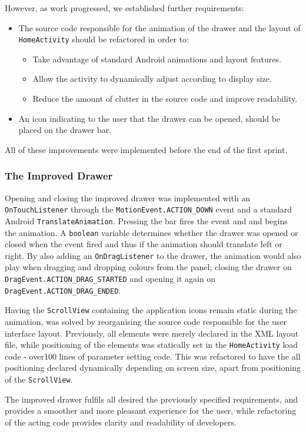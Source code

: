However, as work progressed, we established further requirements:

\begin{itemize}
\item The source code responsible for the animation of the drawer and the layout of \lstinline{HomeActivity} should be refactored in order to:
\begin{itemize}
\item Take advantage of standard Android animations and layout features.
\item Allow the activity to dynamically adjust according to display size.
\item Reduce the amount of clutter in the source code and improve readability.
\end{itemize}
\item An icon indicating to the user that the drawer can be opened, should be placed on the drawer bar.
\end{itemize}

All of these improvements were implemented before the end of the first sprint. 

\subsubsection{The Improved Drawer}

Opening and closing the improved drawer was implemented with an \lstinline{OnTouchListener} through the \lstinline{MotionEvent.ACTION_DOWN} event and a standard Android \lstinline{TranslateAnimation}.
Pressing the bar fires the event and and begins the animation.
A \lstinline{boolean} variable determines whether the drawer was opened or closed when the event fired and thus if the animation should translate left or right.
By also adding an \lstinline{OnDragListener} to the drawer, the animation would also play when dragging and dropping colours from the panel; closing the drawer on \lstinline{DragEvent.ACTION_DRAG_STARTED} and opening it again on \lstinline{DragEvent.ACTION_DRAG_ENDED}.

Having the \lstinline{ScrollView} containing the application icons remain static during the animation, was solved by reorganising the source code responsible for the user interface layout. 
Previously, all elements were merely declared in the XML layout file, while positioning of the elements was statically set in the \lstinline{HomeActivity} load code - over100 lines of parameter setting code.
This was refactored to have the all positioning declared dynamically depending on screen size, apart from positioning of the \lstinline{ScrollView}.

The improved drawer fulfils all desired the previously specified requirements, and provides a smoother and more pleasant experience for the user, while refactoring of the acting code provides clarity and readability of developers.

